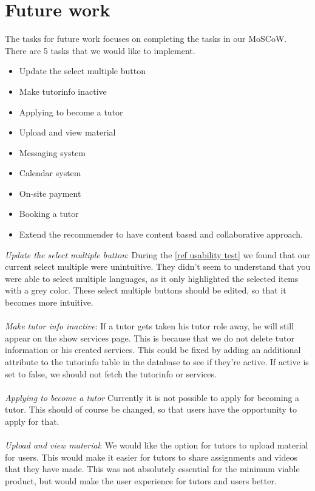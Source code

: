 \section{Future work}
The tasks for future work focuses on completing the tasks in our MoSCoW.
There are 5 tasks that we would like to implement.

\begin{itemize}
    \item Update the select multiple button
    \item Make tutorinfo inactive
    \item Applying to become a tutor
    \item Upload and view material
    \item Messaging system
    \item Calendar system
    \item On-site payment
    \item Booking a tutor
    \item Extend the recommender to have content based and collaborative approach.
\end{itemize}
\noindent
\textit{Update the select multiple button}:
During the \autoref{ref usability test} we found that our current select multiple were unintuitive. 
They didn't seem to understand that you were able to select multiple languages, as it only highlighted the selected items with a grey color.
These select multiple buttons should be edited, so that it becomes more intuitive.
\\\\
\textit{Make tutor info inactive}:
If a tutor gets taken his tutor role away, he will still appear on the show services page. 
This is because that we do not delete tutor information or his created services.
This could be fixed by adding an additional attribute to the tutorinfo table in the database to see if they're active.
If active is set to false, we should not fetch the tutorinfo or services.
\\\\
\textit{Applying to become a tutor}
Currently it is not possible to apply for becoming a tutor.
This should of course be changed, so that users have the opportunity to apply for that. 
\\\\
\textit{Upload and view material}:
We would like the option for tutors to upload material for users. 
This would make it easier for tutors to share assignments and videos that they have made. 
This was not absolutely essential for the minimum viable product, but would make the user experience for tutors and users better.
